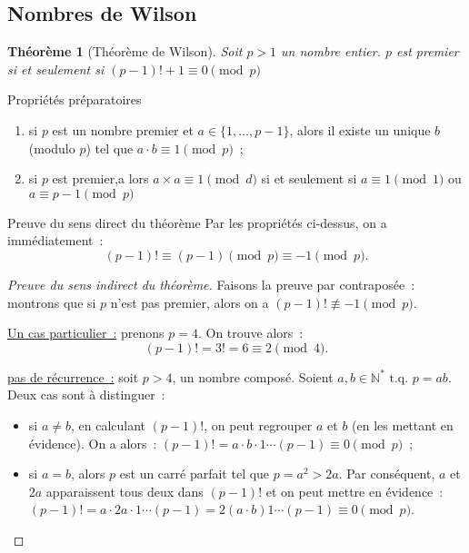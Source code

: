 \documentclass[10pt, mathserif]{beamer}
\newcommand{\tq}{\text{ t.q. }}
\newcommand{\N}{\mathbb N}
\newtheorem{thm}{Théorème}[section]
\theoremstyle{definition}
\theoremstyle{remark}
\begin{document}
	\subsection{Nombres de Wilson}
	\begin{frame}
		\begin{thm}[Théorème de Wilson]
			Soit $p > 1$ un nombre entier. $p$ est premier si et seulement si $(p-1)! + 1 \equiv 0 \pmod p$
		\end{thm}

		\begin{block}{Propriétés préparatoires}
			\begin{enumerate}
				\item si $p$ est un nombre premier et $a \in \{1, \dotsc, p-1\}$, alors il existe un unique $b$ (modulo $p$) tel que $a \cdot b \equiv 1 \pmod p$~;
				\item si $p$ est premier,a lors $a \times a \equiv 1 \pmod d$ si et seulement si $a \equiv 1 \pmod 1$ ou $a \equiv p-1 \pmod p$
			\end{enumerate}
		\end{block}

		\begin{block}{Preuve du sens direct du théorème}
			Par les propriétés ci-dessus, on a immédiatement~:
			\[(p-1)! \equiv (p-1) \pmod p \equiv -1 \pmod p.\]
		\end{block}
	\end{frame}

	\begin{frame}
		\begin{proof}[Preuve du sens indirect du théorème]
			Faisons la preuve par contraposée~: montrons que si $p$ n'est pas premier, alors on a $(p-1)! \not \equiv -1 \pmod p$.

			\underline{Un cas particulier~:} prenons $p = 4$. On trouve alors~:
			\[(p-1)! = 3! = 6 \equiv 2 \pmod 4.\]

			\underline{pas de récurrence~:} soit $p > 4$, un nombre composé. Soient $a, b \in \N^* \tq p = ab$. Deux cas sont à distinguer~:
			\begin{itemize}
				\item si $a \neq b$, en calculant $(p-1)!$, on peut regrouper $a$ et $b$ (en les mettant en évidence). On a alors~:
				$(p-1)! = a \cdot b \cdot 1 \dotsm (p-1) \equiv 0 \pmod p$~;
				\item si $a = b$, alors $p$ est un carré parfait tel que $p = a^2 > 2a$. Par conséquent, $a$ et $2a$ apparaissent tous deux dans $(p-1)!$
				et on peut mettre en évidence~: $(p-1)! = a \cdot 2a \cdot 1 \dotsm (p-1) = 2(a \cdot b)1 \dotsm (p-1) \equiv 0 \pmod p$.
			\end{itemize}
		\end{proof}
	\end{frame}
	
\end{document}
